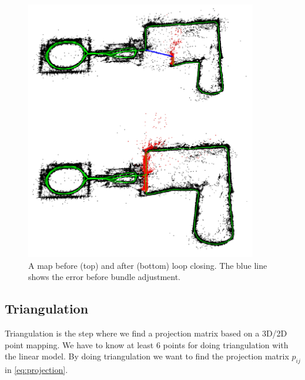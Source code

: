 \documentclass[11pt,a4paper,titlepage,oneside]{report}
\begin{document}
\begin{figure}[H]
  \begin{center}
		\includegraphics[width=0.9\textwidth]{img/loop_closing.jpg}
  \end{center}
	\caption{A map before (top) and after (bottom) loop closing. The blue line shows the error before bundle adjustment.}\label{fig:loop_closing}
\end{figure}

\subsection{Triangulation}\label{sec:triangulation}

Triangulation is the step where we find a projection matrix based on a 3D/2D point mapping. We have to know at least 6 points for doing triangulation with the linear model. By doing triangulation we want to find the projection matrix $p_{ij}$ in \ref{eq:projection}.
\end{document}
